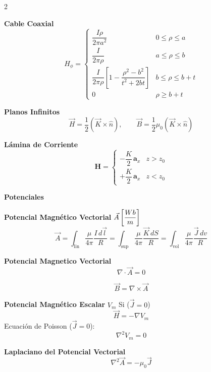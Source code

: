 \documentclass{article}
\begin{document}
  \newpage
\begin{multicols}{2}
\begin{itemform}

\item \textbf{Cable Coaxial}
\[
H_{\phi}=
\begin{cases}
\dfrac{I\rho}{2\pi a^2} & 0 \le \rho \le a\\[6pt]
\dfrac{I}{2\pi\rho} & a \le \rho \le b\\[6pt]
\dfrac{I}{2\pi\rho}\left[1-\dfrac{\rho^2-b^2}{t^2+2bt}\right] & b \le \rho \le b+t\\[6pt]
0 & \rho \ge b+t
\end{cases}
\]

\item \textbf{Planos Infinitos}
\[
\vec{H}=\dfrac{1}{2}(\vec{K}\times\hat{n}), \qquad 
\vec{B}=\dfrac{1}{2}\mu_0(\vec{K}\times\hat{n})
\]

\item \textbf{Lámina de Corriente}
\[
\mathbf{H} =
\begin{cases}
-\dfrac{K}{2}\,\mathbf{a}_x & z>z_0\\[4pt]
+\dfrac{K}{2}\,\mathbf{a}_x & z<z_0
\end{cases}
\]

\end{itemform}
\textbf{Potenciales}
\begin{itemform}
    
\item \textbf{Potencial Magnético Vectorial } $\vec{A} \left[\dfrac{Wb}{m} \right]$ 
$$
\vec{A}
=\int_{\text{lin}} \frac{\mu}{4\pi}\frac{I\,d\vec{l}}{R}
=\int_{\text{sup}} \frac{\mu}{4\pi}\frac{\vec{K}\,dS}{R}
=\int_{\text{vol}} \frac{\mu}{4\pi}\frac{\vec{J}\,dv}{R}
$$
\item \textbf{Potencial Magnetico Vectorial}
$$
\nabla \cdot \vec{A}=0
$$

$$
\vec{B}=\nabla\times\vec{A}
$$


\item \textbf{Potencial Magnético Escalar} $V_m$ Si ($\vec{J}=0$)
\[
\vec{H}=-\nabla V_m
\]
Ecuación de Poisson ($\vec{J}=0$): 
\[
\nabla^2 V_m = 0
\]
\item \textbf{Laplaciano del Potencial Vectorial}
\[
\nabla^2 \vec{A} = -\mu_0 \vec{J}
\]


\end{itemform}
\end{multicols}
\end{document}
